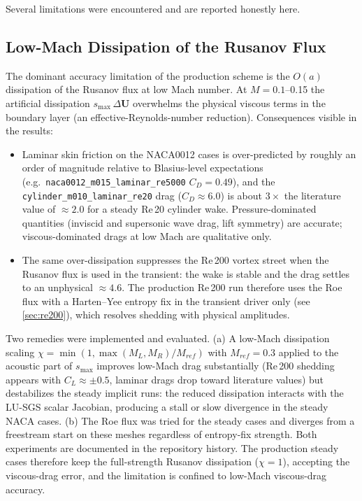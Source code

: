 Several limitations were encountered and are reported honestly here.

\subsection{Low-Mach Dissipation of the Rusanov Flux}
The dominant accuracy limitation of the production scheme is the
$O(a)$ dissipation of the Rusanov flux at low Mach number. At $M=0.1$--0.15
the artificial dissipation $s_{\max}\,\Delta\mathbf U$ overwhelms the physical
viscous terms in the boundary layer (an effective-Reynolds-number reduction).
Consequences visible in the results:
\begin{itemize}
\item Laminar skin friction on the NACA0012 cases is over-predicted by
roughly an order of magnitude relative to Blasius-level expectations
(e.g.\ \texttt{naca0012\_m015\_laminar\_re5000} $C_D=0.49$), and the
\texttt{cylinder\_m010\_laminar\_re20} drag ($C_D\approx6.0$) is about
$3\times$ the literature value of $\approx2.0$ for a steady Re\,20 cylinder
wake. Pressure-dominated quantities (inviscid and supersonic wave drag, lift
symmetry) are accurate; viscous-dominated drags at low Mach are qualitative
only.
\item The same over-dissipation suppresses the Re\,200 vortex street when
the Rusanov flux is used in the transient: the wake is stable and the drag
settles to an unphysical $\approx4.6$. The production Re\,200 run therefore
uses the Roe flux with a Harten--Yee entropy fix in the transient driver
only (see \cref{sec:re200}), which resolves shedding with physical
amplitudes.
\end{itemize}
Two remedies were implemented and evaluated. (a) A low-Mach dissipation
scaling $\chi=\min(1,\max(M_L,M_R)/M_{ref})$ with $M_{ref}=0.3$ applied to
the acoustic part of $s_{\max}$ improves low-Mach drag substantially
(Re\,200 shedding appears with $C_L\approx\pm0.5$, laminar drags drop toward
literature values) but destabilizes the steady implicit runs: the reduced
dissipation interacts with the LU-SGS scalar Jacobian, producing a stall or
slow divergence in the steady NACA cases. (b) The Roe flux was tried for the
steady cases and diverges from a freestream start on these meshes regardless
of entropy-fix strength. Both experiments are documented in the repository
history. The production steady cases therefore keep the full-strength
Rusanov dissipation ($\chi=1$), accepting the viscous-drag error, and the
limitation is confined to low-Mach viscous-drag accuracy.

